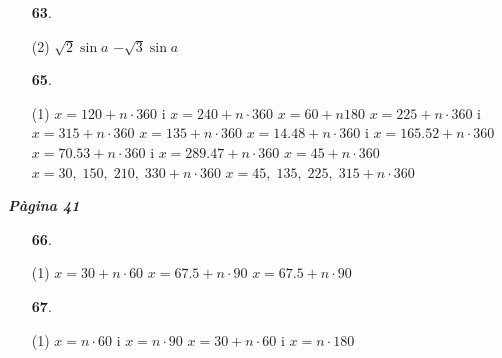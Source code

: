 \documentclass[a4paper, pdf, twoside]{book}
\begin{document}
\begin{multicols}{2}
\begin{enumerate}

 \item[\fontfamily{phv}\selectfont\color{blue}\textbf{63}. ] 
 \begin{tasks}[column-sep=1em, item-indent=1.3333em](2)
	 \task $\sqrt {2}\sin a$
	 \task $-\sqrt {3}\sin a$
\end{tasks}
\vspace{0.25cm}



 \item[\fontfamily{phv}\selectfont\color{blue}\textbf{65}. ] 
 \begin{tasks}[column-sep=1em, item-indent=1.3333em](1)
	 \task* $x=120+n\cdot 360$ i $x=240+n\cdot 360$
	 \task $x=60+n 180$
	 \task* $x=225+n\cdot 360$ i $x=315+n\cdot 360$
	 \task $x=135+n\cdot 360$
	 \task* $x=14.48 + n \cdot 360$ i $x=165.52 + n \cdot 360$
	 \task* $x=70.53 + n \cdot 360$ i $x=289.47 + n \cdot 360$
	 \task $x=45 + n \cdot 360$
	 \task* $x=30,\;150,\;210,\;330 + n \cdot 360$
	 \task* $x=45,\;135,\;225,\;315 + n \cdot 360$
\end{tasks}
 \end{enumerate}
\vspace{0.3cm}


{\textbf{\em Pàgina 41}} \hrulefill
\begin{enumerate}
\vspace{0.25cm}



 \item[\fontfamily{phv}\selectfont\color{blue}\textbf{66}. ] 
 \begin{tasks}[column-sep=1em, item-indent=1.3333em](1)
	 \task $x=30+n\cdot 60$
	 \task $x=67.5+n\cdot 90$
	 \task $x=67.5+n\cdot 90$
\end{tasks}
 \end{enumerate}
\begin{enumerate}
\vspace{0.25cm}



 \item[\fontfamily{phv}\selectfont\color{blue}\textbf{67}. ] 
 \begin{tasks}[column-sep=1em, item-indent=1.3333em](1)
	 \task $x=n\cdot 60$ i $x=n\cdot 90$
	 \task* $x=30+n\cdot 60$ i $x=n\cdot 180$
\end{tasks}
\vspace{0.25cm}



\end{enumerate}
\end{multicols}
\end{document}
